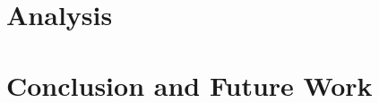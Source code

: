 \documentclass{article}
\begin{document}
\section{Analysis}

\section{Conclusion and Future Work}




\end{document}
